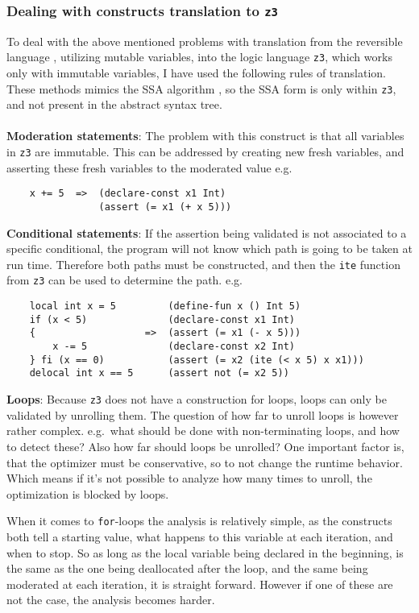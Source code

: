 \subsubsection{Dealing with \lan constructs translation to \texttt{z3}} \label{sec:dealingWithz3}
\label{translation-to-z3}
To deal with the above mentioned problems with translation from the reversible language \lan,
utilizing mutable variables, into the logic language \texttt{z3}, which works only with immutable
variables, I have used the following rules of translation.
These methods mimics the SSA algorithm \cite{SSA}, so the SSA form is only within \texttt{z3}, and
not present in the abstract syntax tree.
\\
\\
\textbf{Moderation statements}: The problem with this construct is that all variables in
\texttt{z3} are immutable. This can be addressed by creating new fresh variables, and asserting
these fresh variables to the moderated value e.g.
\begin{verbatim}
    x += 5  =>  (declare-const x1 Int)
                (assert (= x1 (+ x 5)))
\end{verbatim}
\noindent
\textbf{Conditional statements}:
If the assertion being validated is not associated to a specific conditional, the program will
not know which path is going to be taken at run time. Therefore both paths must be constructed,
and then the \texttt{ite} function from \texttt{z3} can be used to determine the path. e.g.
\begin{verbatim}
    local int x = 5         (define-fun x () Int 5)
    if (x < 5)              (declare-const x1 Int)
    {                   =>  (assert (= x1 (- x 5)))
        x -= 5              (declare-const x2 Int)
    } fi (x == 0)           (assert (= x2 (ite (< x 5) x x1)))
    delocal int x == 5      (assert not (= x2 5))
\end{verbatim}
\noindent
\textbf{Loops}:
Because \texttt{z3} does not have a construction for loops, loops can only be validated by unrolling
them. The question of how far to unroll loops is however rather complex. e.g.\ what should be done
with non-terminating loops, and how to detect these? Also how far should loops be unrolled? One
important factor is, that the optimizer must be conservative, so to not change the runtime behavior.
Which means if it's not possible to analyze how many times to unroll, the optimization is blocked
by loops.

When it comes to \texttt{for}-loops the analysis is relatively simple, as the constructs both
tell a starting value, what happens to this variable at each iteration, and when to stop.
So as long as the local variable being declared in the beginning, is the same as the one being
deallocated after the loop, and the same being moderated at each iteration, it is straight forward.
However if one of these are not the case, the analysis becomes harder.

